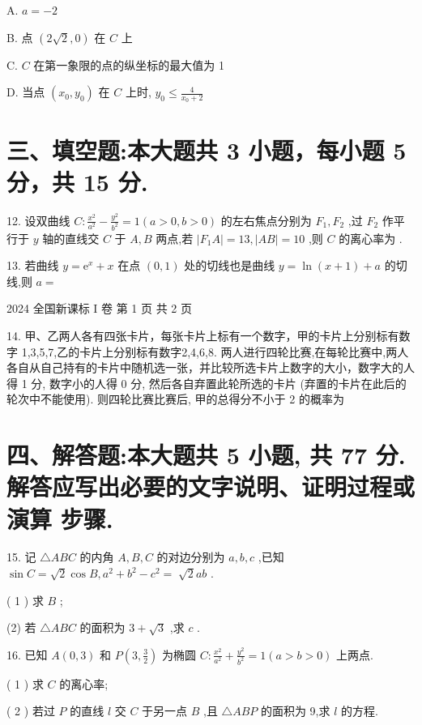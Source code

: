 \documentclass[10pt]{article}
\begin{document}
A. \(a =  - 2\)

B. 点 \(\left( {2\sqrt{2},0}\right)\) 在 \(C\) 上

C. \(C\) 在第一象限的点的纵坐标的最大值为 1

D. 当点 \(\left( {{x}_{0},{y}_{0}}\right)\) 在 \(C\) 上时, \({y}_{0} \leq  \frac{4}{{x}_{0} + 2}\)

\section*{三、填空题:本大题共 3 小题，每小题 5 分，共 15 分.}

12. 设双曲线 \(C : \frac{{x}^{2}}{{a}^{2}} - \frac{{y}^{2}}{{b}^{2}} = 1\left( {a > 0,b > 0}\right)\) 的左右焦点分别为 \({F}_{1},{F}_{2}\) ,过 \({F}_{2}\) 作平行于 \(y\) 轴的直线交 \(C\) 于 \(A,B\) 两点,若 \(\left| {{F}_{1}A}\right|  = {13},\left| {AB}\right|  = {10}\) ,则 \(C\) 的离心率为 .

13. 若曲线 \(y = {\mathrm{e}}^{x} + x\) 在点 \(\left( {0,1}\right)\) 处的切线也是曲线 \(y = \ln \left( {x + 1}\right)  + a\) 的切线,则 \(a =\)

2024 全国新课标 I 卷 第 1 页 共 2 页

14. 甲、乙两人各有四张卡片，每张卡片上标有一个数字，甲的卡片上分别标有数字 1,3,5,7,乙的卡片上分别标有数字2,4,6,8. 两人进行四轮比赛,在每轮比赛中,两人各自从自己持有的卡片中随机选一张，并比较所选卡片上数字的大小，数字大的人得 1 分, 数字小的人得 0 分, 然后各自弃置此轮所选的卡片 (弃置的卡片在此后的轮次中不能使用). 则四轮比赛比赛后, 甲的总得分不小于 2 的概率为

\section*{四、解答题:本大题共 5 小题, 共 77 分. 解答应写出必要的文字说明、证明过程或演算 步骤.}

15. 记 \(\bigtriangleup {ABC}\) 的内角 \(A,B,C\) 的对边分别为 \(a,b,c\) ,已知 \(\sin C = \sqrt{2}\cos B,{a}^{2} + {b}^{2} - {c}^{2} = \; \sqrt{2}{ab}\) .

( 1 ) 求 \(B\) ;

(2) 若 \(\bigtriangleup {ABC}\) 的面积为 \(3 + \sqrt{3}\) ,求 \(c\) .

16. 已知 \(A\left( {0,3}\right)\) 和 \(P\left( {3,\frac{3}{2}}\right)\) 为椭圆 \(C : \frac{{x}^{2}}{{a}^{2}} + \frac{{y}^{2}}{{b}^{2}} = 1\left( {a > b > 0}\right)\) 上两点.

( 1 ) 求 \(C\) 的离心率;

( 2 ) 若过 \(P\) 的直线 \(l\) 交 \(C\) 于另一点 \(B\) ,且 \(\bigtriangleup {ABP}\) 的面积为 9,求 \(l\) 的方程.
\end{document}
